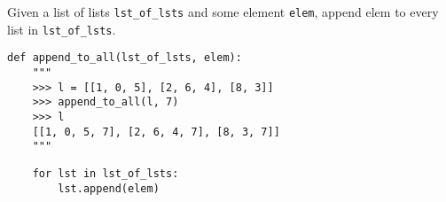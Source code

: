 \question Given a list of lists \texttt{lst\_of\_lsts} and some element
\texttt{elem}, append elem to every list in \texttt{lst\_of\_lsts}.

\begin{lstlisting}
def append_to_all(lst_of_lsts, elem):
    """
    >>> l = [[1, 0, 5], [2, 6, 4], [8, 3]]
    >>> append_to_all(l, 7)
    >>> l
    [[1, 0, 5, 7], [2, 6, 4, 7], [8, 3, 7]]
    """
\end{lstlisting}
\begin{solution}[0in]
\begin{lstlisting}
    for lst in lst_of_lsts:
        lst.append(elem)
\end{lstlisting}
\end{solution}
